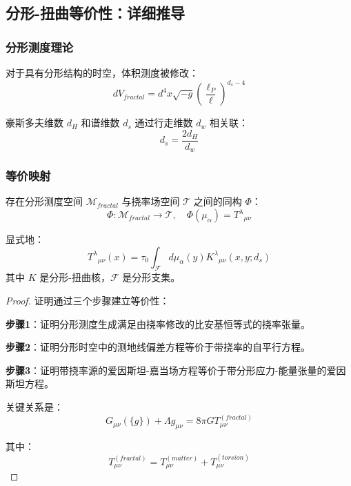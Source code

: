 \subsection{分形-扭曲等价性：详细推导}
\label{sec:fractal_torsion_detail}

\subsubsection{分形测度理论}

对于具有分形结构的时空，体积测度被修改：
\begin{equation}
    dV_{fractal} = d^4x \sqrt{-g} \left(\frac{\ell_P}{\ell}\right)^{d_s - 4}
\end{equation}

豪斯多夫维数 $d_H$ 和谱维数 $d_s$ 通过行走维数 $d_w$ 相关联：
\begin{equation}
    d_s = \frac{2d_H}{d_w}
\end{equation}

\subsubsection{等价映射}

\begin{theorem}
存在分形测度空间 $\mathcal{M}_{fractal}$ 与挠率场空间 $\mathcal{T}$ 之间的同构 $\Phi$：
\begin{equation}
    \Phi: \mathcal{M}_{fractal} \to \mathcal{T}, \quad \Phi(\mu_{\alpha}) = T^{\lambda}{}_{\mu\nu}
\end{equation}

显式地：
\begin{equation}
    T^{\lambda}{}_{\mu\nu}(x) = \tau_0 \int_{\mathcal{F}} d\mu_{\alpha}(y) K^{\lambda}{}_{\mu\nu}(x, y; d_s)
\end{equation}
其中 $K$ 是分形-扭曲核，$\mathcal{F}$ 是分形支集。
\end{theorem}

\begin{proof}
证明通过三个步骤建立等价性：

\textbf{步骤1}：证明分形测度生成满足由挠率修改的比安基恒等式的挠率张量。

\textbf{步骤2}：证明分形时空中的测地线偏差方程等价于带挠率的自平行方程。

\textbf{步骤3}：证明带挠率源的爱因斯坦-嘉当场方程等价于带分形应力-能量张量的爱因斯坦方程。

关键关系是：
\begin{equation}
    G_{\mu\nu}(\{g\}) + \Lambda g_{\mu\nu} = 8\pi G T_{\mu\nu}^{(fractal)}
\end{equation}

其中：
\begin{equation}
    T_{\mu\nu}^{(fractal)} = T_{\mu\nu}^{(matter)} + T_{\mu\nu}^{(torsion)}
\end{equation}
\end{proof}

